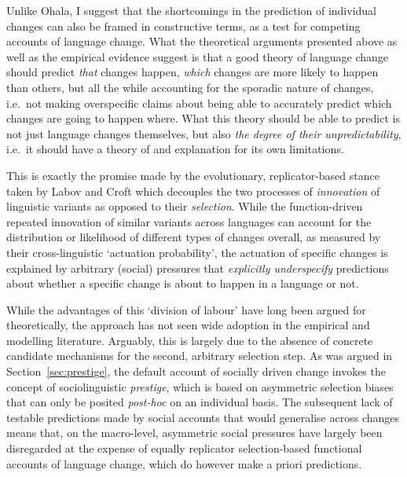 Unlike Ohala, I suggest that the shortcomings in the prediction of individual changes can also be framed in constructive terms, as a test for competing accounts of language change. What the theoretical arguments presented above as well as the empirical evidence suggest is that a good theory of language change should predict \emph{that} changes happen, \emph{which} changes are more likely to happen than others, but all the while accounting for the sporadic nature of changes, i.e.~not making overspecific claims about being able to accurately predict which changes are going to happen where.
What this theory should be able to predict is not just language changes themselves, but also \emph{the degree of their unpredictability}, i.e.~it should have a theory of and explanation for its own limitations.

This is exactly the promise made by the evolutionary, replicator-based stance taken by Labov and Croft which decouples the two processes of \emph{innovation} of linguistic variants as opposed to their \emph{selection}. While the function-driven repeated innovation of similar variants across languages can account for the distribution or likelihood of different types of changes overall, as measured by their cross-linguistic `actuation probability', the actuation of specific changes is explained by arbitrary (social) pressures that \emph{explicitly underspecify} predictions about whether a specific change is about to happen in a language or not.

While the advantages of this `division of labour' have long been argued for theoretically, the approach has not seen wide adoption in the empirical and modelling literature. Arguably, this is largely due to the absence of concrete candidate mechanisms for the second, arbitrary selection step. As was argued in Section~\ref{sec:prestige}, the default account of socially driven change invokes the concept of sociolinguistic \emph{prestige}, which is based on asymmetric selection biases that can only be posited \emph{post-hoc} on an individual basis.
The subsequent lack of testable predictions made by social accounts that would generalise across changes means that, on the macro-level, asymmetric social pressures have largely been disregarded at the expense of equally replicator selection-based functional accounts of language change, which do however make a priori predictions.


